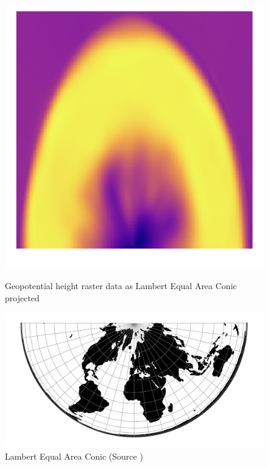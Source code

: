 \begin{figure}[H]
    \centering
    \begin{minipage}{0.30\textwidth}
        \centering
        \includegraphics[width=0.9\linewidth]{figures/chapter-8/geopoth_leac.png}
        \caption{ Geopotential height raster data as Lambert Equal Area Conic projected}
        \label{fig:leac_geopoth_raster}
    \end{minipage}\hfill
    \begin{minipage}{0.30\textwidth}
        \centering
        \includegraphics[width=0.9\linewidth]{figures/chapter-8/leac.png}
        \caption{Lambert Equal Area Conic (Source \cite{PROJ_SITE})}
        \label{fig:leac_proj}
    \end{minipage}\hfill
    \begin{minipage}{0.30\textwidth}
        \centering

\end{minipage}
\end{figure}
